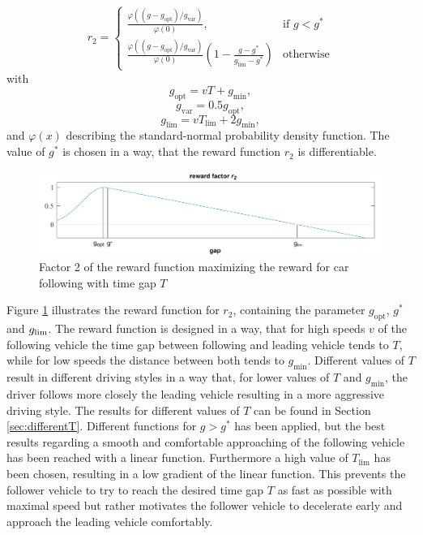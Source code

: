 \documentclass[review]{elsarticle}
\providecommand{\sub}[1]{_{\mathrm{#1}}}  %
\providecommand{\3}{{\ss}}
\begin{document}
\begin{equation}
\label{eq:r1}
r_2  = 
\begin{cases}
\frac{\varphi((g-g\sub{opt})/g\sub{var})}{\varphi(0)},
& \text{if } g < g^*\\
\frac{\varphi((g-g\sub{opt})/g\sub{var})}{\varphi(0)}
\left(1-\frac{g-g^*}{g\sub{lim} - g^*}\right)  & \text{otherwise}
\end{cases}
\end{equation}
with
\begin{equation}
\label{eq:r11}
g\sub{opt} = vT + g\sub{min},
\end{equation}
\begin{equation}
\label{eq:r12}
g\sub{var} = 0.5g\sub{opt},
\end{equation}
\begin{equation}
\label{eq:r13}
g\sub{lim} = vT\sub{lim} + 2g\sub{min},
\end{equation}
%
and $\varphi(x)$ describing the standard-normal probability density
function. The value of $g^*$ is chosen in a way, that the reward function $r_2$ is differentiable.
%
\begin{figure}
	\centering
	\includegraphics[width=12cm]{images/RewardFunc1}
	\caption{Factor 2 of the reward function maximizing the reward
		for car following with time gap $T$} 
	\label{fig:RewardFunc1}
\end{figure}
%
Figure \ref{fig:RewardFunc1} illustrates the reward function for
$r_2$, containing the parameter $g\sub{opt}$, $g^*$ and $g_{\rm
	lim}$. The reward function is designed in a way, that for high speeds $v$
of the following vehicle the time gap between following and leading
vehicle tends to $T$, while for low speeds the distance
between both tends to $g\sub{min}$. Different values of $T$
result in different driving styles in a way that, for lower values of
$T$ and $g\sub{min}$, the driver follows
more closely the leading vehicle resulting in a more aggressive
driving style. The results for different values of $T$ can
be found in Section \ref{sec:differentT}. Different functions for $g
> g^*$ has been applied, but the best results regarding a smooth and
comfortable approaching of the following vehicle has been reached with
a linear function. Furthermore a high value of $T\sub{lim}$ has been chosen, resulting in a low gradient of the linear function. This prevents the follower vehicle to try to reach the desired time gap $T$ as fast as possible with maximal speed but rather motivates the follower vehicle to decelerate early and approach the leading vehicle comfortably.
\end{document}
